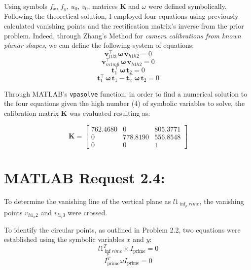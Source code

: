 \documentclass{Configuration_Files/PoliMi3i_thesis}
\begin{document}
Using symbols $f_x$, $f_y$, $u_0$, $v_0$, matrices $\mathbf{K}$ and $\omega$ were defined symbolically. Following the theoretical solution, I employed four equations using previously calculated vanishing points and the rectification matrix's inverse from the prior problem. Indeed, through Zhang's Method for \textit{camera calibrations from known planar shapes}, we can define the following system of equations:
\[
\mathbf{v}_{l1l3}^\top \, \boldsymbol{\omega} \, \mathbf{v}_{h1h2} = 0
\]
\[
\mathbf{v}_{m1m6}^\top \, \boldsymbol{\omega} \, \mathbf{v}_{h1h2} = 0 
\]
\[
\mathbf{t}_1^\top \, \boldsymbol{\omega} \, \mathbf{t}_2 = 0
\]
\[
\mathbf{t}_1^\top \, \boldsymbol{\omega} \, \mathbf{t}_1 - \mathbf{t}_2^\top \, \boldsymbol{\omega} \, \mathbf{t}_2 = 0
\]


Through MATLAB's \texttt{vpasolve} function, in order to find a numerical solution to the four equations given the high number (4) of symbolic variables to solve, the calibration matrix \textbf{K} was evaluated resulting as:

\[
\mathbf{K} = \begin{bmatrix}
762.4680 & 0 & 805.3771 \\
0 & 778.8190 & 556.8548 \\
0 & 0 & 1
\end{bmatrix}
\]



\newpage
\section{MATLAB Request 2.4: }
To determine the vanishing line of the vertical plane as \( l1_{\inf_prime} \), the vanishing points \( v_{h1_h2} \) and \( v_{l1_l3} \) were crossed. 

To identify the circular points, as outlined in Problem 2.2, two equations were established using the symbolic variables \(x\) and \(y\):
\[
l1_{\inf_prime}^{T} \times I_{\text{prime}} = 0
\]
\[
I_{\text{prime}}^{T} \omega I_{\text{prime}} = 0
\]
\end{document}
